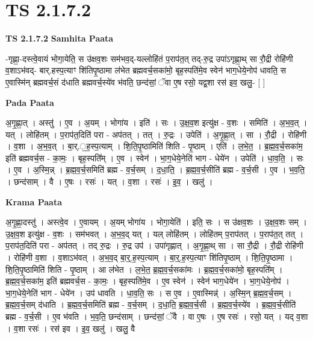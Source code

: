 \documentclass[17pt]{extarticle}
\begin{document}
\section{ TS 2.1.7.2 }

\textbf{TS 2.1.7.2 } \newline
\textbf{Samhita Paata} \newline

-गृह्णा॒-दस्त्वे॒वायं भोगा॒येति॒ स उ॑क्षव॒शः सम॑भव॒द्-यल्लोहि॑तं प॒राप॑त॒त् तद्-रु॒द्र उपा॑ऽगृह्णा॒थ् सा रौ॒द्री रोहि॑णी व॒शाऽभ॑वद्- बार्.हस्प॒त्याꣳ शि॑तिपृ॒ष्ठामा ल॑भेत ब्रह्मवर्च॒सका॑मो॒ बृह॒स्पति॑मे॒व स्वेन॑ भाग॒धेये॒नोप॑ धावति॒ स ए॒वास्मि॑न् ब्रह्मवर्च॒सं द॑धाति ब्रह्मवर्च॒स्ये॑व भ॑वति॒ छन्द॑सां॒ ॅवा ए॒ष रसो॒ यद्व॒शा रस॑ इव॒ खलु॒- [  ] \newline

\textbf{Pada Paata} \newline

अ॒गृ॒ह्णा॒त् । अस्तु॑ । ए॒व । अ॒यम् । भोगा॑य । इति॑ । सः । उ॒क्ष॒व॒श इत्यु॑क्ष - व॒शः । समिति॑ । अ॒भ॒व॒त् । यत् । लोहि॑तम् । प॒राप॑त॒दिति॑ परा - अप॑तत् । तत् । रु॒द्रः । उपेति॑ । अ॒गृ॒ह्णा॒त् । सा । रौ॒द्री । रोहि॑णी । व॒शा । अ॒भ॒व॒त् । बा॒र्.॒ह॒स्प॒त्याम् । शि॒ति॒पृ॒ष्ठामिति॑ शिति - पृ॒ष्ठाम् । एति॑ । ल॒भे॒त॒ । ब्र॒ह्म॒व॒र्च॒सका॑म॒ इति॑ ब्रह्मवर्च॒स - का॒मः॒ । बृह॒स्पति᳚म् । ए॒व । स्वेन॑ । भा॒ग॒धेये॒नेति॑ भाग - धेये॑न । उपेति॑ । धा॒व॒ति॒ । सः । ए॒व । अ॒स्मि॒न्न् । ब्र॒ह्म॒व॒र्च॒समिति॑ ब्रह्म - व॒र्च॒सम् । द॒धा॒ति॒ । ब्र॒ह्म॒व॒र्च॒सीति॑ ब्रह्म - व॒र्च॒सी । ए॒व । भ॒व॒ति॒ । छन्द॑साम् । वै । ए॒षः । रसः॑ । यत् । व॒शा । रसः॑ । इ॒व॒ । खलु॑ ।  \newline


\textbf{Krama Paata} \newline

अ॒गृ॒ह्णा॒दस्तु॑ । अस्त्वे॒व । ए॒वायम् । अ॒यम् भोगा॑य । भोगा॒येति॑ । इति॒ सः । स उ॑क्षव॒शः । उ॒क्ष॒व॒शः सम् । उ॒क्ष॒व॒श इत्यु॑क्ष - व॒शः । सम॑भवत् । अ॒भ॒व॒द् यत् । यल् लोहि॑तम् । लोहि॑तम् प॒राप॑तत् । प॒राप॑त॒त् तत् । प॒राप॑त॒दिति॑ परा - अप॑तत् । तद् रु॒द्रः । रु॒द्र उप॑ । उपा॑गृह्णात् । अ॒गृ॒ह्णा॒थ् सा । सा रौ॒द्री । रौ॒द्री रोहि॑णी । रोहि॑णी व॒शा । व॒शाऽभ॑वत् । अ॒भ॒व॒द् बा॒र्॒.ह॒स्प॒त्याम् । बा॒र्॒.ह॒स्प॒त्याꣳ शि॑तिपृ॒ष्ठाम् । शि॒ति॒पृ॒ष्ठामा । शि॒ति॒पृ॒ष्ठामिति॑ शिति - पृ॒ष्ठाम् । आ ल॑भेत । ल॒भे॒त॒ ब्र॒ह्म॒व॒र्च॒सका॑मः । ब्र॒ह्म॒व॒र्च॒सका॑मो॒ बृह॒स्पति᳚म् । ब्र॒ह्म॒व॒र्च॒सका॑म॒ इति॑ ब्रह्मवर्च॒स - का॒मः॒ । बृह॒स्पति॑मे॒व । ए॒व स्वेन॑ । स्वेन॑ भाग॒धेये॑न । भा॒ग॒धेये॒नोप॑ । भा॒ग॒धेये॒नेति॑ भाग - धेये॑न । उप॑ धावति । धा॒व॒ति॒ सः । स ए॒व । ए॒वास्मिन्न्॑ । अ॒स्मि॒न् ब्र॒ह्म॒व॒र्च॒सम् । ब्र॒ह्म॒व॒र्च॒सम् द॑धाति । ब्र॒ह्म॒व॒र्च॒समिति॑ ब्रह्म - व॒र्च॒सम् । द॒धा॒ति॒ ब्र॒ह्म॒व॒र्च॒सी । ब्र॒ह्म॒व॒र्च॒स्ये॑व । ब्र॒ह्म॒व॒र्च॒सीति॑ ब्रह्म - व॒र्च॒सी । ए॒व भ॑वति । भ॒व॒ति॒ छन्द॑साम् । छन्द॑सां॒ ॅवै । वा ए॒षः । ए॒ष रसः॑ । रसो॒ यत् । यद् व॒शा । व॒शा रसः॑ । रस॑ इव । इ॒व॒ खलु॑ । खलु॒ वै \newline
\end{document}
